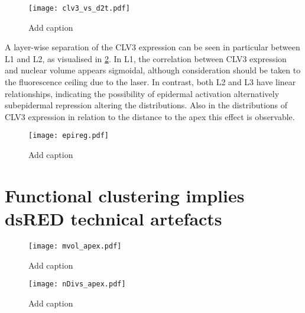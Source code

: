 \begin{figure}[H]
  \centering
  \texttt{[image: clv3\_vs\_d2t.pdf]}
  \caption{Add caption}
  \label{fig:clv3d2t}
\end{figure}

A layer-wise separation of the CLV3 expression can be seen in particular between
L1 and L2, as visualised in \cref{fig:epireg}. In L1, the correlation between
CLV3 expression and nuclear volume appears sigmoidal, although consideration
should be taken to the fluorescence ceiling due to the laser. In contrast, both
L2 and L3 have linear relationships, indicating the possibility of epidermal
activation alternatively subepidermal repression altering the distributions.
Also in the distributions of CLV3 expression in relation to the distance to the
apex this effect is observable.



\begin{figure}[H]
  \centering
  \texttt{[image: epireg.pdf]}
  \caption{Add caption}
  \label{fig:epireg}
\end{figure}






 \section{Functional clustering implies dsRED technical artefacts}

 \begin{figure}[H]
   \centering
   \texttt{[image: mvol\_apex.pdf]}
  \caption{Add caption}
  \label{fig:mvol_apex}
\end{figure}

\begin{figure}[H]
   \centering
   \texttt{[image: nDivs\_apex.pdf]}
   \caption{Add caption}
  \label{fig:mvol_apex}
\end{figure}


